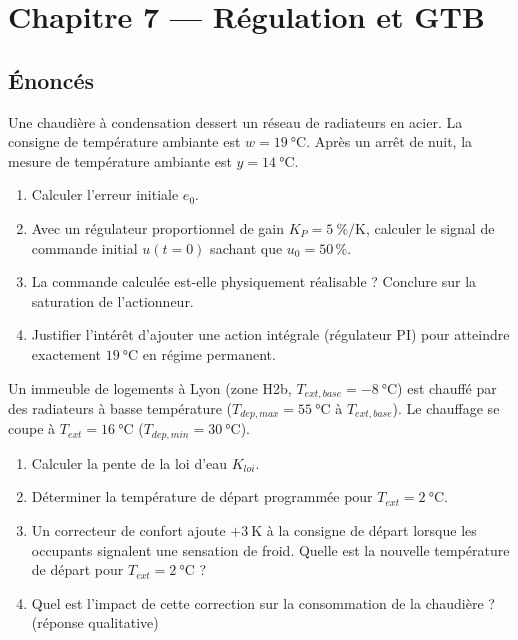 \chapter*{Chapitre 7 — Régulation et GTB}

\section*{Énoncés}


Une chaudière à condensation dessert un réseau de radiateurs en acier. La consigne de température ambiante est $w = \SI{19}{\celsius}$. Après un arrêt de nuit, la mesure de température ambiante est $y = \SI{14}{\celsius}$.

\begin{enumerate}
  \item Calculer l'erreur initiale $e_0$.
  \item Avec un régulateur proportionnel de gain $K_P = \SI{5}{\percent\per\kelvin}$, calculer le signal de commande initial $u(t=0)$ sachant que $u_0 = 50\,\%$.
  \item La commande calculée est-elle physiquement réalisable ? Conclure sur la saturation de l'actionneur.
  \item Justifier l'intérêt d'ajouter une action intégrale (régulateur PI) pour atteindre exactement $\SI{19}{\celsius}$ en régime permanent.
\end{enumerate}


Un immeuble de logements à Lyon (zone H2b, $T_{ext,base} = \SI{-8}{\celsius}$) est chauffé par des radiateurs à basse température ($T_{dep,max} = \SI{55}{\celsius}$ à $T_{ext,base}$). Le chauffage se coupe à $T_{ext} = \SI{16}{\celsius}$ ($T_{dep,min} = \SI{30}{\celsius}$).

\begin{enumerate}
  \item Calculer la pente de la loi d'eau $K_{loi}$.
  \item Déterminer la température de départ programmée pour $T_{ext} = \SI{2}{\celsius}$.
  \item Un correcteur de confort ajoute $+\SI{3}{\kelvin}$ à la consigne de départ lorsque les occupants signalent une sensation de froid. Quelle est la nouvelle température de départ pour $T_{ext} = \SI{2}{\celsius}$ ?
  \item Quel est l'impact de cette correction sur la consommation de la chaudière ? (réponse qualitative)
\end{enumerate}

